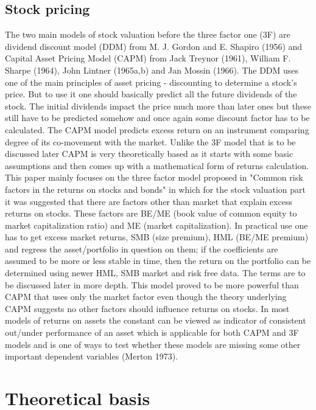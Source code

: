 \documentclass[a4paper,12pt]{article} %
\begin{document}
	\subsection{Stock pricing}
	The two main models of stock valuation before the three factor one (3F) are dividend discount model (DDM) from M. J. Gordon and E. Shapiro (1956)\cite{gordon1956capital} and Capital Asset Pricing Model (CAPM) from Jack Treynor (1961)\cite{treynor1961market}, William F. Sharpe (1964)\cite{sharpe1964capital}, John Lintner (1965a,b)\cite{lintner1965security} and Jan Mossin (1966)\cite{mossin1966equilibrium}.
	The DDM uses one of the main principles of asset pricing - discounting to determine a stock's price. But to use it one should basically predict all the future dividends of the stock. The initial dividends impact the price much more than later ones but these still have to be predicted somehow and once again some discount factor has to be calculated.
	The CAPM model predicts excess return on an instrument comparing degree of its co-movement with the market. Unlike the 3F model that is to be discussed later CAPM is very theoretically based as it starts with some basic assumptions and then comes up with a mathematical form of returns calculation. 
	This paper mainly focuses on the three factor model proposed in "Common risk factors in the returns on stocks and bonds" in which for the stock valuation part it was suggested that there are factors other than market that explain excess returns on stocks. These factors are BE/ME (book value of common equity to market capitalization ratio) and ME (market capitalization). In practical use one has to get excess market returns, SMB (size premium), HML (BE/ME premium) and regress the asset/portfolio in question on them; if the coefficients are assumed to be more or less stable in time, then the return on the portfolio can be determined using newer HML, SMB market and risk free data. The terms are to be discussed later in more depth. This model proved to be more powerful than CAPM that uses only the market factor even though the theory underlying CAPM suggests no other factors should influence returns on stocks. 
	In most models of returns on assets the constant can be viewed as indicator of consistent out/under performance of an asset which is applicable for both CAPM and 3F models and is one of ways to test whether these models are missing some other important dependent variables (Merton 1973)\cite{merton1973intertemporal}.
	
	\newpage
	\section{Theoretical basis}
\end{document}
